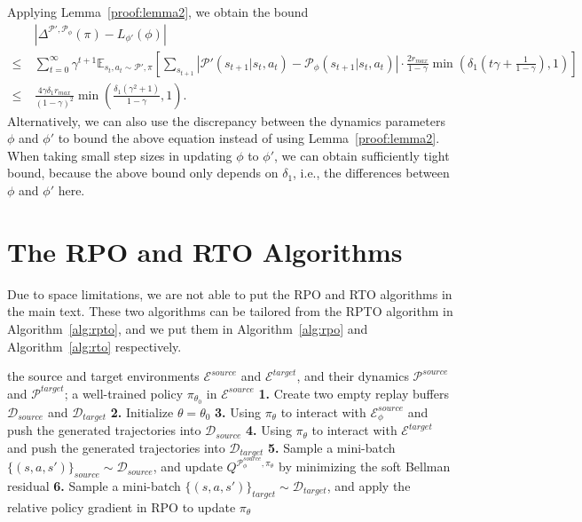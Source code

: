 \documentclass[letterpaper]{article} %
\def\E{{\mathbb{E}}}
\def\P{{\mathcal{P}}}
\begin{document}
Applying Lemma~\ref{proof:lemma2}, we obtain the bound
{\small
\begin{align*}
&|\Delta^{\P',\P_{\phi}}(\pi)-L_{\phi'}(\phi)|
\\
\leq\ &
\sum_{t=0}^{\infty}\gamma^{t+1}\E_{s_t,a_t\sim \P',\pi}\left[
\sum_{s_{t+1}}
\left|
\P'(s_{t+1}|s_t,a_t)-\P_{\phi}(s_{t+1}|s_t,a_t)
\right|\cdot\frac{2r_{max}}{1-\gamma}
\min\left(\delta_1\left(
t\gamma+\frac{1}{1-\gamma}
\right), 1
\right)
\right]
\\
\leq\ &
\frac{4\gamma\delta_1r_{max}}{(1-\gamma)^2}
\min\left(\frac{\delta_1(\gamma^2+1)}{1-\gamma}, 1\right).
\end{align*}
}\noindent
Alternatively, we can also use the discrepancy between the dynamics parameters $\phi$ and $\phi'$ to bound the above equation instead of using Lemma~\ref{proof:lemma2}. When taking small step sizes in updating $\phi$ to $\phi'$, we can obtain sufficiently tight bound, because the above bound only depends on $\delta_1$, i.e., the differences between $\phi$ and $\phi'$ here.

\rightline{$\Box$}


\section{The RPO and RTO Algorithms}
Due to space limitations, we are not able to put the RPO and RTO algorithms in the main text. These two algorithms can be tailored from the RPTO algorithm in Algorithm~\ref{alg:rpto}, and we put them in Algorithm~\ref{alg:rpo} and Algorithm~\ref{alg:rto} respectively.

\begin{algorithm}[h]
\small
   \caption{Relative Policy Optimization (RPO)}
   \label{alg:rpo}
\begin{algorithmic}
    the source and target environments $\mathcal{E}^{source}$ and $\mathcal{E}^{target}$, and their dynamics $\P^{source}$ and $\P^{target}$; a well-trained policy $\pi_{\theta_0}$ in $\mathcal{E}^{source}$\;
   \STATE \textbf{1.} Create two empty replay buffers $\mathcal{D}_{source}$ and $\mathcal{D}_{target}$\;
   \STATE \textbf{2.} Initialize $\theta=\theta_0$\;
   \REPEAT
   \STATE \textbf{3.} Using $\pi_{\theta}$ to interact with $\mathcal{E}_{\phi}^{source}$ and push the generated trajectories into $\mathcal{D}_{source}$\;
   \STATE \textbf{4.} Using $\pi_{\theta}$ to interact with $\mathcal{E}^{target}$ and push the generated trajectories into $\mathcal{D}_{target}$\;
   \STATE \textbf{5.} Sample a mini-batch $\{(s,a,s')\}_{source}\sim\mathcal{D}_{source}$, and update $Q^{\P_{\phi}^{source},\pi_{\theta}}$ by minimizing the soft Bellman residual\;
   \STATE \textbf{6.} Sample a mini-batch $\{(s,a,s')\}_{target}\sim\mathcal{D}_{target}$, and apply the relative policy gradient in RPO to update $\pi_{\theta}$\;
\end{algorithmic}
\end{algorithm}
\end{document}
